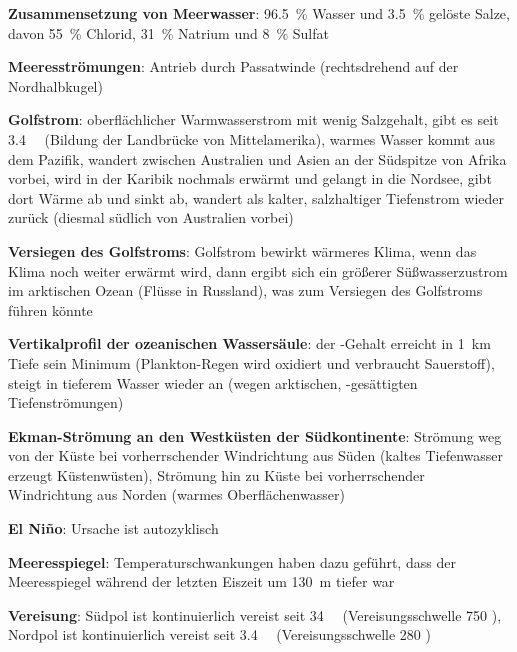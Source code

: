\textbf{Zusammensetzung von Meerwasser}:
\SI{96.5}{\percent} Wasser und
\SI{3.5}{\percent} gelöste Salze,
davon \SI{55}{\percent} Chlorid,
\SI{31}{\percent} Natrium und
\SI{8}{\percent} Sulfat

\textbf{Meeresströmungen}:
Antrieb durch Passatwinde (rechtsdrehend auf der Nordhalbkugel)

\textbf{Golfstrom}:
oberflächlicher Warmwasserstrom mit wenig Salzgehalt,
gibt es seit \SI{3.4}{\mega\year}
(Bildung der Landbrücke von Mittelamerika),
warmes Wasser kommt aus dem Pazifik,
wandert zwischen Australien und Asien an der Südspitze von Afrika vorbei,
wird in der Karibik nochmals erwärmt und gelangt in die Nordsee,
gibt dort Wärme ab und sinkt ab,
wandert als kalter, salzhaltiger Tiefenstrom wieder zurück
(diesmal südlich von Australien vorbei)

\textbf{Versiegen des Golfstroms}:
Golfstrom bewirkt wärmeres Klima,
wenn das Klima noch weiter erwärmt wird,
dann ergibt sich ein größerer Süßwasserzustrom im arktischen Ozean (Flüsse in Russland),
was zum Versiegen des Golfstroms führen könnte

\textbf{Vertikalprofil der ozeanischen Wassersäule}:
der -Gehalt erreicht in \SI{1}{\kilo\meter} Tiefe sein Minimum
(Plankton-Regen wird oxidiert und verbraucht Sauerstoff),
steigt in tieferem Wasser wieder an
(wegen arktischen, -gesättigten Tiefenströmungen)

\textbf{Ekman-Strömung an den Westküsten der Südkontinente}:
Strömung weg von der Küste bei vorherrschender Windrichtung aus Süden
(kaltes Tiefenwasser erzeugt Küstenwüsten),
Strömung hin zu Küste bei vorherrschender Windrichtung aus Norden
(warmes Oberflächenwasser)

\textbf{El Niño}:
Ursache ist autozyklisch

\textbf{Meeresspiegel}:
Temperaturschwankungen haben dazu geführt, dass der Meeresspiegel während der letzten Eiszeit
um \SI{130}{\meter} tiefer war

\textbf{Vereisung}:
Südpol ist kontinuierlich vereist seit \SI{34}{\mega\year}
(Vereisungsschwelle \SI{750}{\ppm} ),
Nordpol ist kontinuierlich vereist seit \SI{3.4}{\mega\year}
(Vereisungsschwelle \SI{280}{\ppm} )

